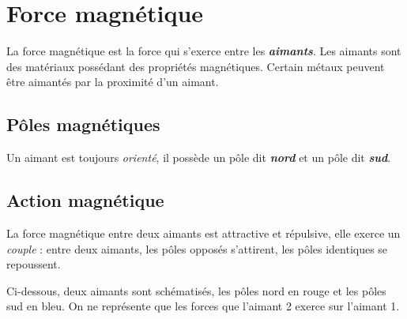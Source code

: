 
\section{Force magnétique}
%

La force magnétique est la force qui s'exerce entre les \textbf{\textit {aimants}}.
Les aimants sont des matériaux possédant des propriétés magnétiques.
Certain métaux peuvent être aimantés par la proximité d'un aimant.

\subsection{Pôles magnétiques}

Un aimant est toujours {\it orienté}, il possède un pôle dit \textbf{\textit {nord}} et un pôle
dit \textbf{\textit {sud}}.


\subsection{Action magnétique}

La force magnétique entre deux aimants est attractive et répulsive, elle exerce un {\it couple} :
entre deux aimants, les pôles opposés s'attirent, les pôles identiques se repoussent. 

Ci-dessous, deux aimants sont schématisés, les pôles nord en rouge et les pôles sud en bleu. On ne représente que les forces que l'aimant 2 exerce sur l'aimant 1.

\begin{center}
\end{center}
